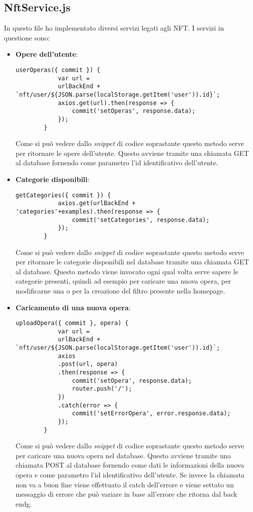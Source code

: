 \subsection{NftService.js}
\label{subsubsec:nftservice}

In questo file ho implementato diversi servizi legati agli NFT. I servizi in questione sono:
\begin{itemize}
	\item \textbf{Opere dell'utente}:
	\begin{lstlisting}[caption=Opere dell'utente., label=lst::opereUtente]
		userOperas({ commit }) {
			var url =
			urlBackEnd + `nft/user/${JSON.parse(localStorage.getItem('user')).id}`;
			axios.get(url).then(response => {
				commit('setOperas', response.data);
			});
		}
	\end{lstlisting}
	Come si può vedere dallo \textit{snippet} di codice soprastante questo metodo serve per ritornare le opere dell'utente. Questo avviene tramite una chiamata GET al database fornendo come parametro l'id identificativo dell'utente.
	\item \textbf{Categorie disponibili}:
	\begin{lstlisting}[caption=Categorie disponibili., label=lst::catDisponibili]
		getCategories({ commit }) {
			axios.get(urlBackEnd + 'categories'+examples).then(response => {
				commit('setCategories', response.data);
			});
		}
	\end{lstlisting}
	Come si può vedere dallo \textit{snippet} di codice soprastante questo metodo serve per ritornare le categorie disponibili nel database tramite una chiamata GET al database. Questo metodo viene invocato ogni qual volta serve sapere le categorie presenti, quindi ad esempio per caricare una nuova opera, per modificarne una o per la creazione del filtro presente nella homepage.
	\item \textbf{Caricamento di una nuova opera}:
	\begin{lstlisting}[caption=Caricamento di una nuova opera., label=lst::uploadOpera]
		uploadOpera({ commit }, opera) {
			var url =
			urlBackEnd + `nft/user/${JSON.parse(localStorage.getItem('user')).id}`;
			axios
			.post(url, opera)
			.then(response => {
				commit('setOpera', response.data);
				router.push('/');
			})
			.catch(error => {
				commit('setErrorOpera', error.response.data);
			});
		}
	\end{lstlisting}
	Come si può vedere dallo \textit{snippet} di codice soprastante questo metodo serve per caricare una nuova opera nel database. Questo avviene tramite una chiamata POST al database fornendo come dati le informazioni della nuova opera e come parametro l'id identificativo dell'utente. Se invece  la chiamata non va a buon fine viene effettuato il catch dell'errore e viene settato un messaggio di errore che può variare in base all'errore che ritorna dal \gls{back endg}.

\end{itemize}
